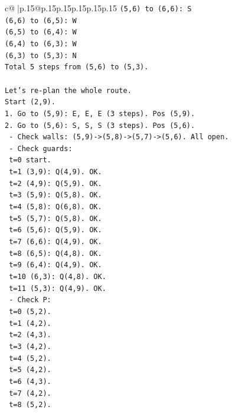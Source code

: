 \documentclass{article}
\begin{document}
{\begin{supertabular}{c@{$\;$}|p{.15\linewidth}@{}p{.15\linewidth}p{.15\linewidth}p{.15\linewidth}p{.15\linewidth}p{.15\linewidth}}
{{{\texttt{(5,6) to (6,6): S} \\
\texttt{(6,6) to (6,5): W} \\
\texttt{(6,5) to (6,4): W} \\
\texttt{(6,4) to (6,3): W} \\
\texttt{(6,3) to (5,3): N} \\
\texttt{Total 5 steps from (5,6) to (5,3).} \\
\\ 
\texttt{Let's re{-}plan the whole route.} \\
\texttt{Start (2,9).} \\
\texttt{1. Go to (5,9): E, E, E (3 steps). Pos (5,9).} \\
\texttt{2. Go to (5,6): S, S, S (3 steps). Pos (5,6).} \\
\texttt{   {-} Check walls: (5,9){-}>(5,8){-}>(5,7){-}>(5,6). All open.} \\
\texttt{   {-} Check guards:} \\
\texttt{     t=0 start.} \\
\texttt{     t=1 (3,9): Q(4,9). OK.} \\
\texttt{     t=2 (4,9): Q(5,9). OK.} \\
\texttt{     t=3 (5,9): Q(5,8). OK.} \\
\texttt{     t=4 (5,8): Q(6,8). OK.} \\
\texttt{     t=5 (5,7): Q(5,8). OK.} \\
\texttt{     t=6 (5,6): Q(5,9). OK.} \\
\texttt{     t=7 (6,6): Q(4,9). OK.} \\
\texttt{     t=8 (6,5): Q(4,8). OK.} \\
\texttt{     t=9 (6,4): Q(4,9). OK.} \\
\texttt{     t=10 (6,3): Q(4,8). OK.} \\
\texttt{     t=11 (5,3): Q(4,9). OK.} \\
\texttt{   {-} Check P:} \\
\texttt{     t=0 (5,2).} \\
\texttt{     t=1 (4,2).} \\
\texttt{     t=2 (4,3).} \\
\texttt{     t=3 (4,2).} \\
\texttt{     t=4 (5,2).} \\
\texttt{     t=5 (4,2).} \\
\texttt{     t=6 (4,3).} \\
\texttt{     t=7 (4,2).} \\
\texttt{     t=8 (5,2).} \\
}}}
\end{supertabular}}
\end{document}
